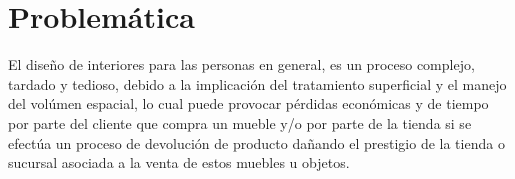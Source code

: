\section{Problemática}
El diseño de interiores para las personas en general, es un proceso complejo, tardado y tedioso, debido a la implicación del tratamiento superficial y el manejo del volúmen espacial, lo cual puede provocar pérdidas económicas y de tiempo por parte del cliente que compra un mueble y/o por parte de la tienda si se efectúa un proceso de devolución de producto dañando el prestigio de la tienda o sucursal asociada a la venta de estos muebles u objetos.

   